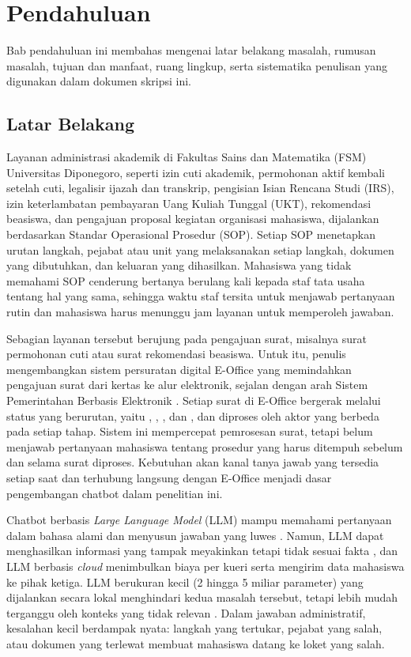 \chapter{Pendahuluan}
\label{bab:1}
Bab pendahuluan ini membahas mengenai latar belakang masalah, rumusan masalah, tujuan dan manfaat, ruang lingkup, serta sistematika penulisan yang digunakan dalam dokumen skripsi ini.

\section{Latar Belakang}
\label{sec:latar}
Layanan administrasi akademik di Fakultas Sains dan Matematika (FSM) Universitas Diponegoro, seperti izin cuti akademik, permohonan aktif kembali setelah cuti, legalisir ijazah dan transkrip, pengisian Isian Rencana Studi (IRS), izin keterlambatan pembayaran Uang Kuliah Tunggal (UKT), rekomendasi beasiswa, dan pengajuan proposal kegiatan organisasi mahasiswa, dijalankan berdasarkan Standar Operasional Prosedur (SOP). Setiap SOP menetapkan urutan langkah, pejabat atau unit yang melaksanakan setiap langkah, dokumen yang dibutuhkan, dan keluaran yang dihasilkan. Mahasiswa yang tidak memahami SOP cenderung bertanya berulang kali kepada staf tata usaha tentang hal yang sama, sehingga waktu staf tersita untuk menjawab pertanyaan rutin dan mahasiswa harus menunggu jam layanan untuk memperoleh jawaban.

Sebagian layanan tersebut berujung pada pengajuan surat, misalnya surat permohonan cuti atau surat rekomendasi beasiswa. Untuk itu, penulis mengembangkan sistem persuratan digital E-Office yang memindahkan pengajuan surat dari kertas ke alur elektronik, sejalan dengan arah Sistem Pemerintahan Berbasis Elektronik \parencite{perpres95_2018}. Setiap surat di E-Office bergerak melalui status yang berurutan, yaitu , , , dan , dan diproses oleh aktor yang berbeda pada setiap tahap. Sistem ini mempercepat pemrosesan surat, tetapi belum menjawab pertanyaan mahasiswa tentang prosedur yang harus ditempuh sebelum dan selama surat diproses. Kebutuhan akan kanal tanya jawab yang tersedia setiap saat dan terhubung langsung dengan E-Office menjadi dasar pengembangan chatbot dalam penelitian ini.

Chatbot berbasis \textit{Large Language Model} (LLM) mampu memahami pertanyaan dalam bahasa alami dan menyusun jawaban yang luwes \parencite{brown2020gpt3}. Namun, LLM dapat menghasilkan informasi yang tampak meyakinkan tetapi tidak sesuai fakta \parencite{ji2023hallucination}, dan LLM berbasis \textit{cloud} menimbulkan biaya per kueri serta mengirim data mahasiswa ke pihak ketiga. LLM berukuran kecil (2 hingga 5 miliar parameter) yang dijalankan secara lokal menghindari kedua masalah tersebut, tetapi lebih mudah terganggu oleh konteks yang tidak relevan \parencite{liu2024lost}. Dalam jawaban administratif, kesalahan kecil berdampak nyata: langkah yang tertukar, pejabat yang salah, atau dokumen yang terlewat membuat mahasiswa datang ke loket yang salah.

